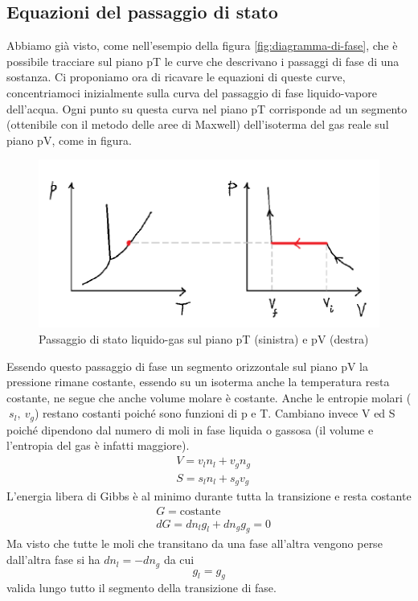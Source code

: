 \documentclass[10pt,a4paper]{article}
\begin{document}
\subsection{Equazioni del passaggio di stato}
Abbiamo già visto, come nell'esempio della figura \ref{fig:diagramma-di-fase}, che è possibile tracciare sul piano pT le curve che descrivano i passaggi di fase di una sostanza. Ci proponiamo ora di ricavare le equazioni di queste curve, concentriamoci inizialmente sulla curva del passaggio di fase liquido-vapore dell'acqua. Ogni punto su questa curva nel piano pT corrisponde ad un segmento (ottenibile con il metodo delle aree di Maxwell) dell'isoterma del gas reale sul piano pV, come in figura.
\begin{figure}[h!]
	\centering
	\includegraphics[width=0.4\linewidth]{../images/equaz_passaggio_stato}
	\caption{Passaggio di stato liquido-gas sul piano pT (sinistra) e pV (destra)}
	\label{fig:equazpassaggiostato}
\end{figure}
\FloatBarrier
Essendo questo passaggio di fase un segmento orizzontale sul piano pV la pressione rimane costante, essendo su un isoterma anche la temperatura resta costante, ne segue che anche volume molare è costante. Anche le entropie molari (\(\ s_l,\ v_g\)) restano costanti poiché sono funzioni di p e T. Cambiano invece V ed S poiché dipendono dal numero di moli in fase liquida o gassosa (il volume e l'entropia del gas è infatti maggiore). 
\begin{align*}
	&V = v_l n_l + v_g n_g\\
	&S = s_l n_l + s_g v_g
\end{align*}
L'energia libera di Gibbs è al minimo durante tutta la transizione e resta costante 
\begin{align*}
	&G = \text{costante}\\
	&dG = dn_l g_l + dn_g g_g =  0
\end{align*}
Ma visto che tutte le moli che transitano da una fase all'altra vengono perse dall'altra fase si ha 
\(dn_l = -dn_g\) da cui
\[g_l = g_g\]
valida lungo tutto il segmento della transizione di fase.\\
\end{document}
